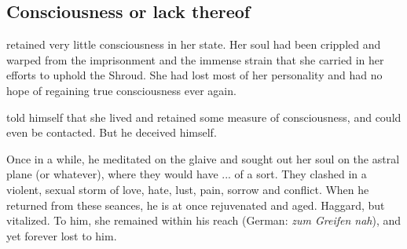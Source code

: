 








\subsection{Consciousness or lack thereof}
\Rystessakhin{} retained very little consciousness in her state. 
Her soul had been crippled and warped from the imprisonment and the immense strain that she carried in her efforts to uphold the Shroud. 
She had lost most of her personality and had no hope of regaining true consciousness ever again. 

\Ishnaruchaefir{} told himself that she lived and retained some measure of consciousness, and could even be contacted. 
But he deceived himself. 

Once in a while, he meditated on the glaive and sought out her soul on the astral plane (or whatever), where they would have ... of a sort. 
They clashed in a violent, sexual storm of love, hate, lust, pain, sorrow and conflict. 
When he returned from these seances, he is at once rejuvenated and aged. 
Haggard, but vitalized. 
To him, she remained within his reach (German: \emph{zum Greifen nah}), and yet forever lost to him. 


